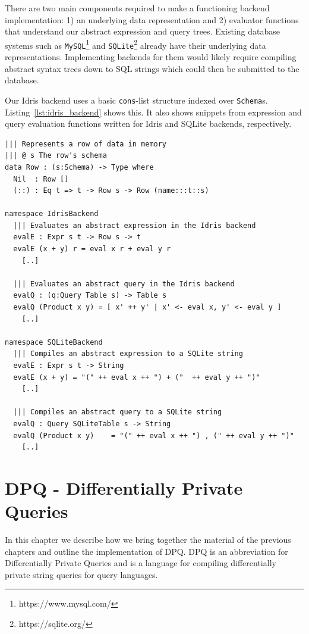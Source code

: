 \documentclass[12pt]{report}
\begin{document}
There are two main components required to make a functioning backend implementation:
1) an underlying data representation and
2) evaluator functions that understand our abstract expression and query trees.
Existing database systems such as \texttt{MySQL}\footnote{https://www.mysql.com/} and \texttt{SQLite}\footnote{https://sqlite.org/} already have their underlying data representations.
Implementing backends for them would likely require compiling abstract syntax trees down to SQL strings which could then be submitted to the database.

Our Idris backend uses a basic \texttt{cons}-list structure indexed over \texttt{Schema}s.
Listing~\ref{lst:idris_backend} shows this.
It also shows snippets from expression and query evaluation functions written for Idris and SQLite backends, respectively.

\begin{lstlisting}[caption={Implementing backends (snippets)},label={lst:idris_backend}]
||| Represents a row of data in memory
||| @ s The row's schema
data Row : (s:Schema) -> Type where
  Nil  : Row []
  (::) : Eq t => t -> Row s -> Row (name:::t::s)

namespace IdrisBackend
  ||| Evaluates an abstract expression in the Idris backend
  evalE : Expr s t -> Row s -> t
  evalE (x + y) r = eval x r + eval y r
    [..]

  ||| Evaluates an abstract query in the Idris backend
  evalQ : (q:Query Table s) -> Table s
  evalQ (Product x y) = [ x' ++ y' | x' <- eval x, y' <- eval y ]
    [..]

namespace SQLiteBackend
  ||| Compiles an abstract expression to a SQLite string
  evalE : Expr s t -> String
  evalE (x + y) = "(" ++ eval x ++ ") + ("  ++ eval y ++ ")"
    [..]

  ||| Compiles an abstract query to a SQLite string
  evalQ : Query SQLiteTable s -> String
  evalQ (Product x y)    = "(" ++ eval x ++ ") , (" ++ eval y ++ ")"
    [..]
\end{lstlisting}


\chapter{DPQ - Differentially Private Queries}\label{sec:DPQ}

In this chapter we describe how we bring together the material of the previous chapters and outline the implementation of DPQ.
DPQ is an abbreviation for Differentially Private Queries and is a language for compiling differentially private string queries for query languages.
\end{document}
